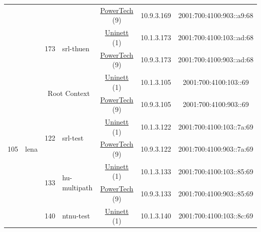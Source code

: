 \begin{small}
\begin{center}
\begin{longtable}{|c|c|c|c|c|c|c|c|}
  &  &  &  & \multicolumn{2}{|c|}{\tiny{\href{http://www.powertech.no}{PowerTech} (9)}} & \tiny{10.9.3.169} & \tiny{2001:700:4100:903::a9:68} \\* \cline{3-3}\cline{4-4}\cline{5-5}\cline{6-6}\cline{7-7}\cline{8-8}
  &  & \multirow{2}{*}{\tiny{173}} & \multicolumn{1}{|l|}{\multirow{2}{*}{\tiny{srl-thuen}}} & \multicolumn{2}{|c|}{\tiny{\href{https://www.uninett.no}{Uninett} (1)}} & \tiny{10.1.3.173} & \tiny{2001:700:4100:103::ad:68} \\* \cline{5-5}\cline{6-6}\cline{7-7}\cline{8-8}
  &  &  &  & \multicolumn{2}{|c|}{\tiny{\href{http://www.powertech.no}{PowerTech} (9)}} & \tiny{10.9.3.173} & \tiny{2001:700:4100:903::ad:68} \\ \hline
 \multirow{18}{*}{\tiny{105}} & \multicolumn{1}{|l|}{\multirow{18}{*}{\tiny{lena}}} & \multicolumn{2}{|c|}{\multirow{2}{*}{\tiny{Root Context}}} & \multicolumn{2}{|c|}{\tiny{\href{https://www.uninett.no}{Uninett} (1)}} & \tiny{10.1.3.105} & \tiny{2001:700:4100:103::69} \\* \cline{5-5}\cline{6-6}\cline{7-7}\cline{8-8}
  &  & \multicolumn{2}{|c|}{} & \multicolumn{2}{|c|}{\tiny{\href{http://www.powertech.no}{PowerTech} (9)}} & \tiny{10.9.3.105} & \tiny{2001:700:4100:903::69} \\* \cline{3-3}\cline{4-4}\cline{5-5}\cline{6-6}\cline{7-7}\cline{8-8}
  &  & \multirow{2}{*}{\tiny{122}} & \multicolumn{1}{|l|}{\multirow{2}{*}{\tiny{srl-test}}} & \multicolumn{2}{|c|}{\tiny{\href{https://www.uninett.no}{Uninett} (1)}} & \tiny{10.1.3.122} & \tiny{2001:700:4100:103::7a:69} \\* \cline{5-5}\cline{6-6}\cline{7-7}\cline{8-8}
  &  &  &  & \multicolumn{2}{|c|}{\tiny{\href{http://www.powertech.no}{PowerTech} (9)}} & \tiny{10.9.3.122} & \tiny{2001:700:4100:903::7a:69} \\* \cline{3-3}\cline{4-4}\cline{5-5}\cline{6-6}\cline{7-7}\cline{8-8}
  &  & \multirow{2}{*}{\tiny{133}} & \multicolumn{1}{|l|}{\multirow{2}{*}{\tiny{hu-multipath}}} & \multicolumn{2}{|c|}{\tiny{\href{https://www.uninett.no}{Uninett} (1)}} & \tiny{10.1.3.133} & \tiny{2001:700:4100:103::85:69} \\* \cline{5-5}\cline{6-6}\cline{7-7}\cline{8-8}
  &  &  &  & \multicolumn{2}{|c|}{\tiny{\href{http://www.powertech.no}{PowerTech} (9)}} & \tiny{10.9.3.133} & \tiny{2001:700:4100:903::85:69} \\* \cline{3-3}\cline{4-4}\cline{5-5}\cline{6-6}\cline{7-7}\cline{8-8}
  &  & \multirow{2}{*}{\tiny{140}} & \multicolumn{1}{|l|}{\multirow{2}{*}{\tiny{ntnu-test}}} & \multicolumn{2}{|c|}{\tiny{\href{https://www.uninett.no}{Uninett} (1)}} & \tiny{10.1.3.140} & \tiny{2001:700:4100:103::8c:69} \\* \cline{5-5}\cline{6-6}\cline{7-7}\cline{8-8}

\end{longtable}
\end{center}
\end{small}
